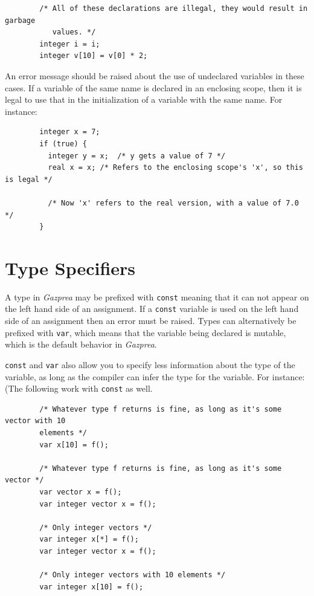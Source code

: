 \documentclass{article}
\begin{document}
	\begin{lstlisting}
		/* All of these declarations are illegal, they would result in garbage
		   values. */
		integer i = i;
		integer v[10] = v[0] * 2;
	\end{lstlisting}

	An error message should be raised about the use of undeclared variables in these cases. If a variable of the same
	name is declared in an enclosing scope, then it is legal to use that in the initialization of a variable with the
	same name. For instance:

	\begin{lstlisting}
		integer x = 7;
		if (true) {
		  integer y = x;  /* y gets a value of 7 */
		  real x = x; /* Refers to the enclosing scope's 'x', so this is legal */

		  /* Now 'x' refers to the real version, with a value of 7.0 */
		}
	\end{lstlisting}


\section{Type Specifiers}\label{sec:typeSpecifiers}
	A type in \textit{Gazprea} may be prefixed with \texttt{const} meaning that it can not appear on the left hand side
	of an assignment. If a \texttt{const} variable is used on the left hand side of an assignment then an error must be
	raised. Types can alternatively be prefixed with \texttt{var}, which means that the variable being declared is
	mutable, which is the default behavior in \textit{Gazprea}.

	\texttt{const} and \texttt{var} also allow you to specify less information about the type of the variable, as long
	as the compiler can infer the type for the variable. For instance: (The following work with \texttt{const} as well.

	\begin{lstlisting}
		/* Whatever type f returns is fine, as long as it's some vector with 10
		elements */
		var x[10] = f();

		/* Whatever type f returns is fine, as long as it's some vector */
		var vector x = f();
		var integer vector x = f();

		/* Only integer vectors */
		var integer x[*] = f();
		var integer vector x = f();

		/* Only integer vectors with 10 elements */
		var integer x[10] = f();
	\end{lstlisting}
\end{document}
